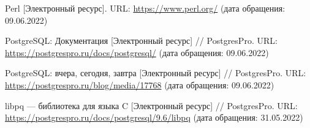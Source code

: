 \begin{thebibliography}{1}
	Perl [Электронный ресурс].
	URL: \url{https://www.perl.org/}
	(дата обращения: 09.06.2022)
	
	PostgreSQL: Документация [Электронный ресурс] // PostgresPro.
	URL: \url{https://postgrespro.ru/docs/postgresql/}
	(дата обращения: 09.06.2022)
	
	PostgreSQL: вчера, сегодня, завтра [Электронный ресурс] // PostgresPro.
	URL: \url{https://postgrespro.ru/blog/media/17768}
	(дата обращения: 09.06.2022)
	
	libpq — библиотека для языка C [Электронный ресурс] // PostgresPro.
	URL: \url{https://postgrespro.ru/docs/postgresql/9.6/libpq}
	(дата обращения: 31.05.2022)
	
\end{thebibliography}


%
%
%	
%
%	
%	
%	
%	
%	
%	
%	
%	
%	
%
%
